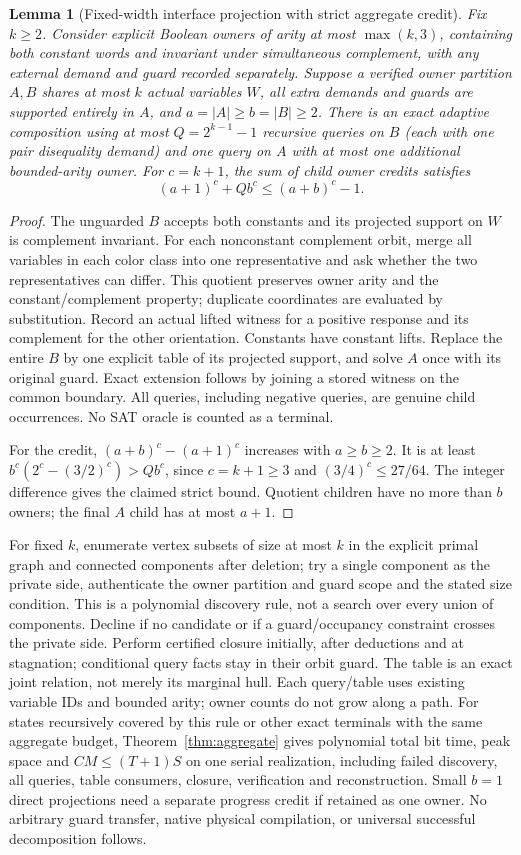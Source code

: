 \documentclass[11pt]{article}
\newtheorem{lemma}[theorem]{Lemma}
\begin{document}
\begin{lemma}[Fixed-width interface projection with strict aggregate credit]\label{lem:rt23-credit}
Fix $k\ge2$. Consider explicit Boolean owners of arity at most $\max(k,3)$, containing both constant words and invariant under simultaneous complement, with any external demand and guard recorded separately. Suppose a verified owner partition $A,B$ shares at most $k$ actual variables $W$, all extra demands and guards are supported entirely in $A$, and $a=|A|\ge b=|B|\ge2$. There is an exact adaptive composition using at most $Q=2^{k-1}-1$ recursive queries on $B$ (each with one pair disequality demand) and one query on $A$ with at most one additional bounded-arity owner. For $c=k+1$, the sum of child owner credits satisfies
\[
(a+1)^c+Qb^c\le(a+b)^c-1.
\]
\end{lemma}
\begin{proof}
The unguarded $B$ accepts both constants and its projected support on $W$ is complement invariant. For each nonconstant complement orbit, merge all variables in each color class into one representative and ask whether the two representatives can differ. This quotient preserves owner arity and the constant/complement property; duplicate coordinates are evaluated by substitution. Record an actual lifted witness for a positive response and its complement for the other orientation. Constants have constant lifts. Replace the entire $B$ by one explicit table of its projected support, and solve $A$ once with its original guard. Exact extension follows by joining a stored witness on the common boundary. All queries, including negative queries, are genuine child occurrences. No SAT oracle is counted as a terminal.

For the credit, $(a+b)^c-(a+1)^c$ increases with $a\ge b\ge2$. It is at least $b^c(2^c-(3/2)^c)>Qb^c$, since $c=k+1\ge3$ and $(3/4)^c\le27/64$. The integer difference gives the claimed strict bound. Quotient children have no more than $b$ owners; the final $A$ child has at most $a+1$.
\end{proof}
For fixed $k$, enumerate vertex subsets of size at most $k$ in the explicit primal graph and connected components after deletion; try a single component as the private side, authenticate the owner partition and guard scope and the stated size condition. This is a polynomial discovery rule, not a search over every union of components. Decline if no candidate or if a guard/occupancy constraint crosses the private side. Perform certified closure initially, after deductions and at stagnation; conditional query facts stay in their orbit guard. The table is an exact joint relation, not merely its marginal hull. Each query/table uses existing variable IDs and bounded arity; owner counts do not grow along a path. For states recursively covered by this rule or other exact terminals with the same aggregate budget, Theorem~\ref{thm:aggregate} gives polynomial total bit time, peak space and $CM\le(T+1)S$ on one serial realization, including failed discovery, all queries, table consumers, closure, verification and reconstruction. Small $b=1$ direct projections need a separate progress credit if retained as one owner. No arbitrary guard transfer, native physical compilation, or universal successful decomposition follows.
\end{document}
